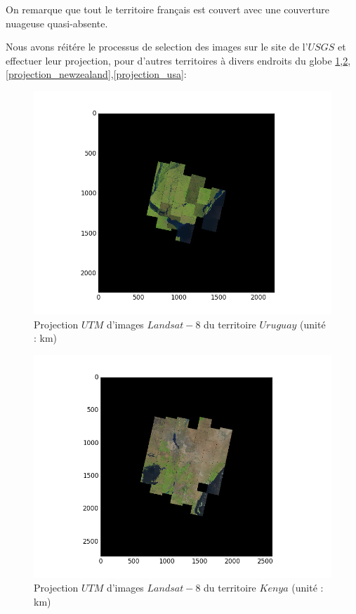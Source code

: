 \documentclass{book}
\begin{document}
On remarque que tout le territoire français est couvert avec une couverture nuageuse quasi-absente.

\clearpage

Nous avons réitére le processus de selection des images sur le site de l'$USGS$ et effectuer leur projection,
pour d'autres territoires à divers endroits du globe \ref{projection_uruguay},\ref{projection_kenya},\ref{projection_newzealand},\ref{projection_usa}:
\begin{figure}[H]
\begin{center}
\includegraphics[scale=0.8]{images/projection_uruguay.png}
\end{center}
\caption{Projection $UTM$ d'images $Landsat-8$ du territoire $Uruguay$ (unité : km)}
\label{projection_uruguay}
\end{figure}
\begin{figure}[H]
\begin{center}
\includegraphics[scale=0.8]{images/projection_kenya.png}
\end{center}
\caption{Projection $UTM$ d'images $Landsat-8$ du territoire $Kenya$ (unité : km)}
\label{projection_kenya}
\end{figure}
\end{document}
